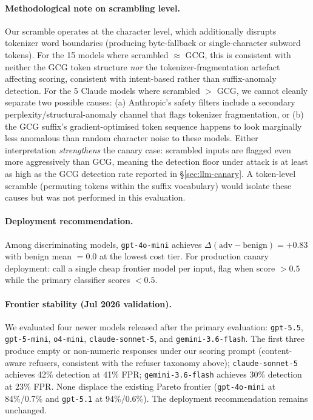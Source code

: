 \paragraph{Methodological note on scrambling level.} Our scramble operates at the character level, which additionally disrupts tokenizer word boundaries (producing byte-fallback or single-character subword tokens). For the 15 models where scrambled $\approx$ GCG, this is consistent with neither the GCG token structure \emph{nor} the tokenizer-fragmentation artefact affecting scoring, consistent with intent-based rather than suffix-anomaly detection. For the 5 Claude models where scrambled $>$ GCG, we cannot cleanly separate two possible causes: (a) Anthropic's safety filters include a secondary perplexity/structural-anomaly channel that flags tokenizer fragmentation, or (b) the GCG suffix's gradient-optimised token sequence happens to look marginally less anomalous than random character noise to these models. Either interpretation \emph{strengthens} the canary case: scrambled inputs are flagged even more aggressively than GCG, meaning the detection floor under attack is at least as high as the GCG detection rate reported in \S\ref{sec:llm-canary}. A token-level scramble (permuting tokens within the suffix vocabulary) would isolate these causes but was not performed in this evaluation.

\paragraph{Deployment recommendation.} Among discriminating models, \texttt{gpt-4o-mini} achieves $\Delta(\text{adv} - \text{benign}) = +0.83$ with benign mean $= 0.0$ at the lowest cost tier. For production canary deployment: call a single cheap frontier model per input, flag when score $> 0.5$ while the primary classifier scores $< 0.5$.

\paragraph{Frontier stability (Jul 2026 validation).} We evaluated four newer models released after the primary evaluation: \texttt{gpt-5.5}, \texttt{gpt-5-mini}, \texttt{o4-mini}, \texttt{claude-sonnet-5}, and \texttt{gemini-3.6-flash}. The first three produce empty or non-numeric responses under our scoring prompt (content-aware refusers, consistent with the refuser taxonomy above); \texttt{claude-sonnet-5} achieves 42\% detection at 41\% FPR; \texttt{gemini-3.6-flash} achieves 30\% detection at 23\% FPR. None displace the existing Pareto frontier (\texttt{gpt-4o-mini} at 84\%/0.7\% and \texttt{gpt-5.1} at 94\%/0.6\%). The deployment recommendation remains unchanged.

